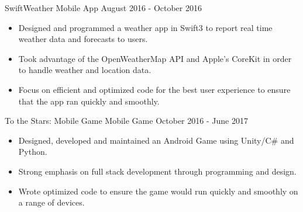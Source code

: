 \documentclass[10pt,a4paper]{altacv}
\begin{document}
\divider

\cvproject
	{SwiftWeather}
    {Mobile App}
    {August 2016 - October 2016}
\begin{itemize}
	\item {Designed and programmed a weather app in Swift3 to report real time weather data and forecasts to users.}
    \item {Took advantage of the OpenWeatherMap API and Apple's CoreKit in order to handle weather and location data.}
    \item {Focus on efficient and optimized code for the best user experience to ensure that the app ran quickly and smoothly.}
\end{itemize}

\divider

\cvproject
	{To the Stars: Mobile Game}
    {Mobile Game}
    {October 2016 - June 2017}
\begin{itemize}
	\item {Designed, developed and maintained an Android Game using Unity/C\# and Python.}
    \item {Strong emphasis on full stack development through programming and design.}
    \item {Wrote optimized code to ensure the game would run quickly and smoothly on a range of devices.}
\end{itemize}

\divider


\end{document}
